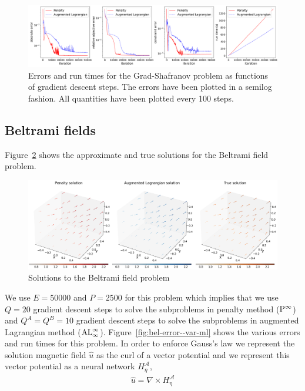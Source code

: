 \begin{figure}[!ht]
    \centering
\includegraphics[scale=0.32]{var-ml/plots/var-plots-Grad-Shafranov-error.png}
    \caption{Errors and run times for the Grad-Shafranov problem as functions of gradient descent steps. The errors have been plotted in a semilog fashion. All quantities have been plotted every 100 steps.}
    \label{fig:gs-error--var-ml}
\end{figure}
\subsection{Beltrami fields}
Figure~\ref{fig:bel--var-ml} shows the approximate and true solutions for the Beltrami field problem.
\begin{figure}[!ht]
    \centering
\includegraphics[scale=0.32]{var-ml/plots/var-plots-Beltrami-field.png}
    \caption{Solutions to the Beltrami field problem}
    \label{fig:bel--var-ml}
\end{figure}
 We use $E=50000$ and $P=2500$ for this problem which implies that we use $Q=20$ gradient descent steps to solve the subproblems in penalty method (${\rm P}^\infty$) and $Q^A=Q^B=10$ gradient descent steps to solve the subproblems in augmented Lagrangian method (${\rm AL}^\infty_\infty$). Figure~\ref{fig:bel-error--var-ml} shows the various errors and run times for this problem. In order to enforce Gauss's law we represent the solution magnetic field $\hat u$ as the curl of a vector potential and we represent this vector potential as a neural network $H^{\mathcal A}_{\eta}$, 
 \begin{align}
     \hat u = \nabla\times H^{\mathcal A}_{\eta}
 \end{align}
